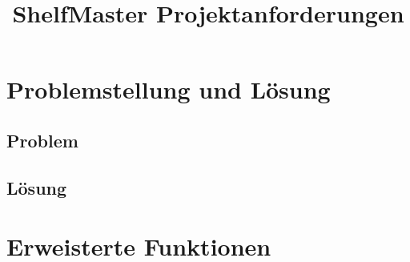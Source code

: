 \documentclass{article}
\title{ShelfMaster Projektanforderungen}
\begin{document}
\maketitle

\section{Problemstellung und Lösung}
  \subsection{Problem}
  \subsection{Lösung}

\section{Erweisterte Funktionen}
\end{document}
